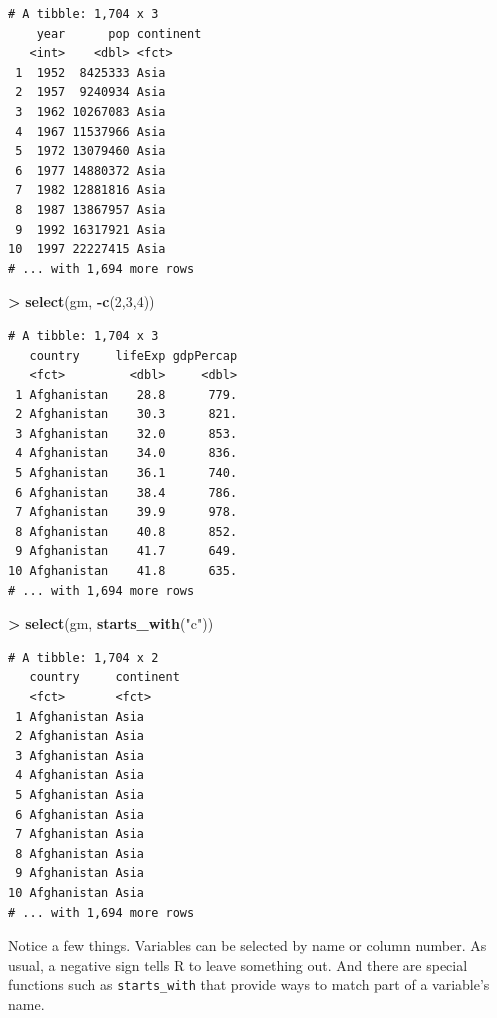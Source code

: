 \documentclass[]{krantz}
\makeatletter
\newenvironment{Shaded}{\begin{snugshade}}{\end{snugshade}}
\newcommand{\KeywordTok}[1]{\textcolor[rgb]{0.27,0.27,0.27}{\textbf{#1}}}
\newcommand{\DecValTok}[1]{\textcolor[rgb]{0.06,0.06,0.06}{#1}}
\newcommand{\StringTok}[1]{\textcolor[rgb]{0.5,0.5,0.5}{#1}}
\newcommand{\OperatorTok}[1]{\textcolor[rgb]{0.43,0.43,0.43}{\textbf{#1}}}
\newcommand{\NormalTok}[1]{#1}
\newenvironment{kframe}{%
\medskip{}
\setlength{\fboxsep}{.8em}
 \def\at@end@of@kframe{}%
 \ifinner\ifhmode%
  \def\at@end@of@kframe{\end{minipage}}%
  \begin{minipage}{\columnwidth}%
 \fi\fi%
 \def\FrameCommand##1{\hskip\@totalleftmargin \hskip-\fboxsep
 \colorbox{shadecolor}{##1}\hskip-\fboxsep
     \hskip-\linewidth \hskip-\@totalleftmargin \hskip\columnwidth}%
 \MakeFramed {\advance\hsize-\width
   \@totalleftmargin\z@ \linewidth\hsize
   \@setminipage}}%
 {\par\unskip\endMakeFramed%
 \at@end@of@kframe}
\renewenvironment{Shaded}{\begin{kframe}}{\end{kframe}}
\makeatother
\begin{document}
\begin{verbatim}
# A tibble: 1,704 x 3
    year      pop continent
   <int>    <dbl> <fct>    
 1  1952  8425333 Asia     
 2  1957  9240934 Asia     
 3  1962 10267083 Asia     
 4  1967 11537966 Asia     
 5  1972 13079460 Asia     
 6  1977 14880372 Asia     
 7  1982 12881816 Asia     
 8  1987 13867957 Asia     
 9  1992 16317921 Asia     
10  1997 22227415 Asia     
# ... with 1,694 more rows
\end{verbatim}

\begin{Shaded}
\begin{Highlighting}[]
\OperatorTok{>}\StringTok{ }\KeywordTok{select}\NormalTok{(gm, }\OperatorTok{-}\KeywordTok{c}\NormalTok{(}\DecValTok{2}\NormalTok{,}\DecValTok{3}\NormalTok{,}\DecValTok{4}\NormalTok{))}
\end{Highlighting}
\end{Shaded}

\begin{verbatim}
# A tibble: 1,704 x 3
   country     lifeExp gdpPercap
   <fct>         <dbl>     <dbl>
 1 Afghanistan    28.8      779.
 2 Afghanistan    30.3      821.
 3 Afghanistan    32.0      853.
 4 Afghanistan    34.0      836.
 5 Afghanistan    36.1      740.
 6 Afghanistan    38.4      786.
 7 Afghanistan    39.9      978.
 8 Afghanistan    40.8      852.
 9 Afghanistan    41.7      649.
10 Afghanistan    41.8      635.
# ... with 1,694 more rows
\end{verbatim}

\begin{Shaded}
\begin{Highlighting}[]
\OperatorTok{>}\StringTok{ }\KeywordTok{select}\NormalTok{(gm, }\KeywordTok{starts_with}\NormalTok{(}\StringTok{"c"}\NormalTok{))}
\end{Highlighting}
\end{Shaded}

\begin{verbatim}
# A tibble: 1,704 x 2
   country     continent
   <fct>       <fct>    
 1 Afghanistan Asia     
 2 Afghanistan Asia     
 3 Afghanistan Asia     
 4 Afghanistan Asia     
 5 Afghanistan Asia     
 6 Afghanistan Asia     
 7 Afghanistan Asia     
 8 Afghanistan Asia     
 9 Afghanistan Asia     
10 Afghanistan Asia     
# ... with 1,694 more rows
\end{verbatim}

Notice a few things. Variables can be selected by name or column number.
As usual, a negative sign tells R to leave something out. And there are
special functions such as \texttt{starts\_with} that provide ways to
match part of a variable's name.
\end{document}
